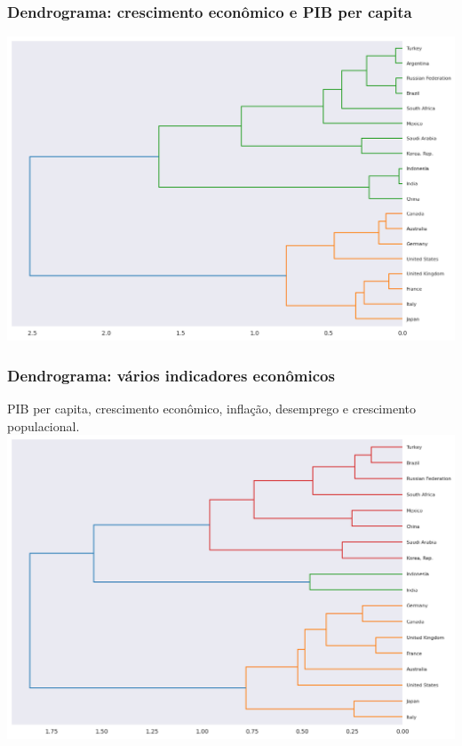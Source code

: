 \documentclass{beamer}
\begin{document}
\begin{frame}
\frametitle{Dendrograma: crescimento econômico e PIB per capita}
\center\includegraphics[width=\textwidth]{dendrogram-economy-1.png}
\end{frame}

\begin{frame}
\frametitle{Dendrograma: vários indicadores econômicos}
\small PIB per capita, crescimento econômico, inflação, desemprego e crescimento populacional.
\center\includegraphics[width=\textwidth]{dendrogram-economy-2.png}
\end{frame}
\end{document}
